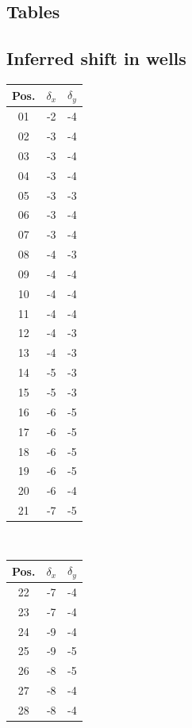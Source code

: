 \documentclass[pdftex,12pt,a4paper]{report}
\begin{document}
\begin{appendices}
\newpage

\chapter{Tables}
\label{chapter:appendix_tables}

\section{Inferred shift in wells}

\begin{table}[H]
\centering
\begin{tabular}[t]{ c | c | c }
\hline
Pos. & $\delta_x$ & $\delta_y$
\\
\hline\hline
01 & -2 & -4
\\
02 & -3 & -4
\\
03 & -3 & -4
\\
04 & -3 & -4
\\
05 & -3 & -3
\\
06 & -3 & -4
\\
07 & -3 & -4
\\
08 & -4 & -3
\\
09 & -4 & -4
\\
10 & -4 & -4
\\
11 & -4 & -4
\\
12 & -4 & -3
\\
13 & -4 & -3
\\
14 & -5 & -3
\\
15 & -5 & -3
\\
16 & -6 & -5
\\
17 & -6 & -5
\\
18 & -6 & -5
\\
19 & -6 & -5
\\
20 & -6 & -4
\\
21 & -7 & -5
\end{tabular}
~
\begin{tabular}[t]{ c | c | c }
\hline
Pos. & $\delta_x$ & $\delta_y$
\\
\hline\hline
22 & -7 & -4
\\
23 & -7 & -4
\\
24 & -9 & -4
\\
25 & -9 & -5
\\
26 & -8 & -5
\\
27 & -8 & -4
\\
28 & -8 & -4
\\

\end{tabular}
\end{table}
\end{appendices}
\end{document}
